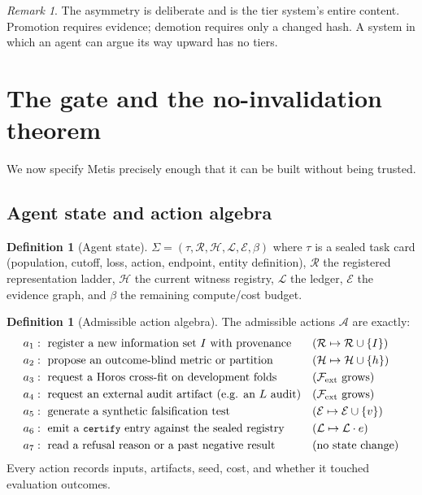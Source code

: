 \documentclass[11pt,a4paper]{article}
\theoremstyle{definition}
\newtheorem{definition}[theorem]{Definition}
\theoremstyle{remark}
\newtheorem{remark}[theorem]{Remark}
\newcommand{\Fcal}{\mathcal{F}}
\newcommand{\Hcal}{\mathcal{H}}
\newcommand{\Acal}{\mathcal{A}}
\newcommand{\code}[1]{\texttt{\small#1}}
\begin{document}
\begin{remark}
The asymmetry is deliberate and is the tier system's entire content. Promotion requires evidence; demotion requires only a changed hash. A system in which an agent can argue its way upward has no tiers.
\end{remark}

\section{The gate and the no-invalidation theorem}\label{sec:gate}

We now specify Metis precisely enough that it can be built without being trusted.

\subsection{Agent state and action algebra}

\begin{definition}[Agent state]\label{def:state}
$\Sigma=(\tau,\mathcal{R},\Hcal,\mathcal{L},\mathcal{E},\beta)$ where $\tau$ is a sealed task card (population, cutoff, loss, action, endpoint, entity definition), $\mathcal{R}$ the registered representation ladder, $\Hcal$ the current witness registry, $\mathcal{L}$ the ledger, $\mathcal{E}$ the evidence graph, and $\beta$ the remaining compute/cost budget.
\end{definition}

\begin{definition}[Admissible action algebra]\label{def:actions}
The admissible actions $\Acal$ are exactly:
\begin{align*}
a_1&:\ \text{register a new information set } I \text{ with provenance} &&(\mathcal{R}\mapsto\mathcal{R}\cup\{I\})\\
a_2&:\ \text{propose an outcome-blind metric or partition} &&(\Hcal\mapsto\Hcal\cup\{h\})\\
a_3&:\ \text{request a Horos cross-fit on development folds} &&(\Fcal_{\rm ext}\text{ grows})\\
a_4&:\ \text{request an external audit artifact (e.g. an } L\text{ audit)} &&(\Fcal_{\rm ext}\text{ grows})\\
a_5&:\ \text{generate a synthetic falsification test} &&(\mathcal{E}\mapsto\mathcal{E}\cup\{v\})\\
a_6&:\ \text{emit a \code{certify} entry against the sealed registry} &&(\mathcal{L}\mapsto\mathcal{L}\cdot e)\\
a_7&:\ \text{read a refusal reason or a past negative result} &&(\text{no state change})
\end{align*}
Every action records inputs, artifacts, seed, cost, and whether it touched evaluation outcomes.
\end{definition}
\end{document}
